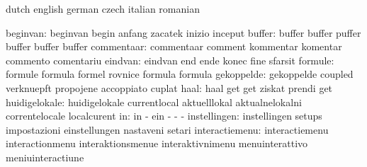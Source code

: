 \stopsetupvariables




\startelements             dutch                     english
                           german                    czech
                           italian                   romanian

                 beginvan: beginvan                  begin
                           anfang                    zacatek
                           inizio                    inceput
                   buffer: buffer                    buffer
                           puffer                    buffer
                           buffer                    buffer
               commentaar: commentaar                comment
                           kommentar                 komentar
                           commento                  comentariu
                  eindvan: eindvan                   end
                           ende                      konec
                           fine                      sfarsit
                  formule: formule                   formula
                           formel                    rovnice
                           formula                   formula
               gekoppelde: gekoppelde                coupled
                           verknuepft                propojene
                           accoppiato                cuplat
                     haal: haal                      get
                           get                       ziskat
                           prendi                    get
            huidigelokale: huidigelokale             currentlocal
                           aktuelllokal              aktualnelokalni
                           correntelocale            localcurent
                       in: in                        -
                           ein                       -
                           -                         -
             instellingen: instellingen              setups
                           impostazioni              einstellungen
                           nastaveni                 setari
           interactiemenu: interactiemenu            interactionmenu
                           interaktionsmenue         interaktivnimenu
                           menuinterattivo           meniuinteractiune

